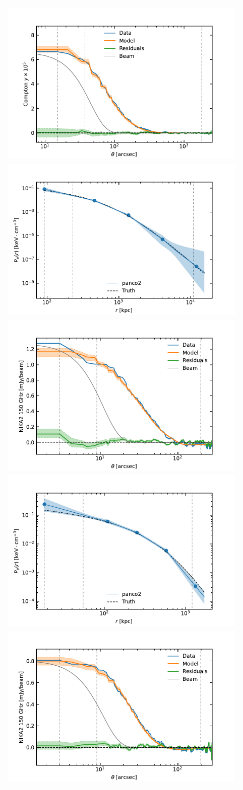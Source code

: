 \begin{figure}[t]
    \includegraphics[height=4cm, trim={0 0 1cm 0.5cm}, clip]{../validation/results/C2/SPT/data_model_residuals_profiles.pdf}
    \includegraphics[height=4cm, trim={0 0 1cm 0.5cm}, clip]{../validation/results/C2/SPT/pressure_profile.pdf} \\
    \includegraphics[height=4cm, trim={0 0 1cm 0.5cm}, clip]{../validation/results/C2/NIKA2/data_model_residuals_profiles.pdf}
    \includegraphics[height=4cm, trim={0 0 1cm 0.5cm}, clip]{../validation/results/C2/NIKA2/pressure_profile.pdf} \\
    \includegraphics[height=4cm, trim={0 0 1cm 0.5cm}, clip]{../validation/results/C3/NIKA2/data_model_residuals_profiles.pdf}

\end{figure}
